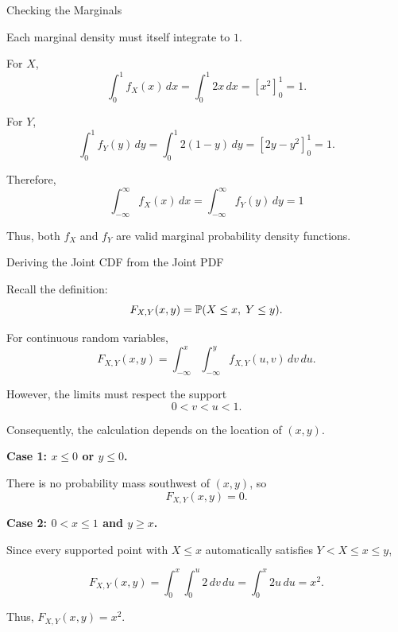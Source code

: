 \begin{frame}{Checking the Marginals}

Each marginal density must itself integrate to $1$.

For $X$,
\[
\int_0^1 f_X(x)\,dx
=
\int_0^1 2x\,dx
=
\left[x^2\right]_0^1
=
1.
\]

For $Y$,
\[
\int_0^1 f_Y(y)\,dy
=
\int_0^1 2(1-y)\,dy
=
\left[2y-y^2\right]_0^1
=
1.
\]

Therefore,
\[
\boxed{
\int_{-\infty}^{\infty} f_X(x)\,dx
=
\int_{-\infty}^{\infty} f_Y(y)\,dy
=
1
}
\]

Thus, both $f_X$ and $f_Y$ are valid marginal probability density functions.

\end{frame}


\begin{frame}{Deriving the Joint CDF from the Joint PDF}

Recall the definition:
$$
F_{X,Y}(x,y)
=
\mathbb{P}(X\le x,\;Y\le y).
$$

For continuous random variables,
$$
\boxed{
F_{X,Y}(x,y)
=
\int_{-\infty}^{x}
\int_{-\infty}^{y}
f_{X,Y}(u,v)\,dv\,du.
}
$$

However, the limits must respect the support
$$
0<v<u<1.
$$

Consequently, the calculation depends on the location of $(x,y)$.

\textbf{Case 1: $x\le0$ or $y\le0$.}

There is no probability mass southwest of $(x,y)$, so
$$
{F_{X,Y}(x,y)=0.}
$$

\textbf{Case 2: $0<x\le1$ and $y\ge x$.}

Since every supported point with $X\le x$ automatically satisfies
$Y<X\le x\le y$,

\begin{equation}
F_{X,Y}(x,y)=
\int_0^x\int_0^u 2\,dv\,du = \int_0^x 2u\,du =
x^2.
\end{equation}
 
Thus, ${F_{X,Y}(x,y)=x^2.}$
 
\end{frame}


